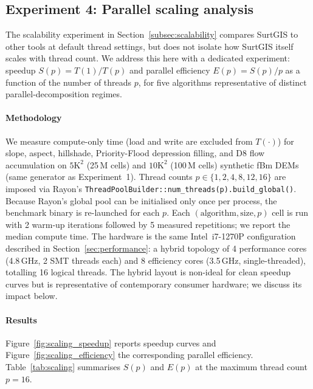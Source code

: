 \documentclass[preprint,review,12pt,authoryear]{elsarticle}
\begin{document}
\subsection{Experiment 4: Parallel scaling analysis}
\label{subsec:parallel_scaling}

The scalability experiment in Section~\ref{subsec:scalability} compares SurtGIS to other tools at default thread settings, but does not isolate how SurtGIS itself scales with thread count. We address this here with a dedicated experiment: speedup $S(p) = T(1)/T(p)$ and parallel efficiency $E(p) = S(p)/p$ as a function of the number of threads $p$, for five algorithms representative of distinct parallel-decomposition regimes.

\paragraph{Methodology} We measure compute-only time (load and write are excluded from $T(\cdot)$) for slope, aspect, hillshade, Priority-Flood depression filling, and D8 flow accumulation on $5\text{K}^2$ (25\,M cells) and $10\text{K}^2$ (100\,M cells) synthetic fBm DEMs (same generator as Experiment~1). Thread counts $p \in \{1, 2, 4, 8, 12, 16\}$ are imposed via Rayon's \texttt{ThreadPoolBuilder::num\_threads(p).build\_global()}. Because Rayon's global pool can be initialised only once per process, the benchmark binary is re-launched for each $p$. Each $(\text{algorithm}, \text{size}, p)$ cell is run with 2 warm-up iterations followed by 5 measured repetitions; we report the median compute time. The hardware is the same Intel~i7-1270P configuration described in Section~\ref{sec:performance}: a hybrid topology of 4 performance cores (4.8\,GHz, 2 SMT threads each) and 8 efficiency cores (3.5\,GHz, single-threaded), totalling 16 logical threads. The hybrid layout is non-ideal for clean speedup curves but is representative of contemporary consumer hardware; we discuss its impact below.

\paragraph{Results} Figure~\ref{fig:scaling_speedup} reports speedup curves and Figure~\ref{fig:scaling_efficiency} the corresponding parallel efficiency. Table~\ref{tab:scaling} summarises $S(p)$ and $E(p)$ at the maximum thread count $p=16$.
\end{document}
